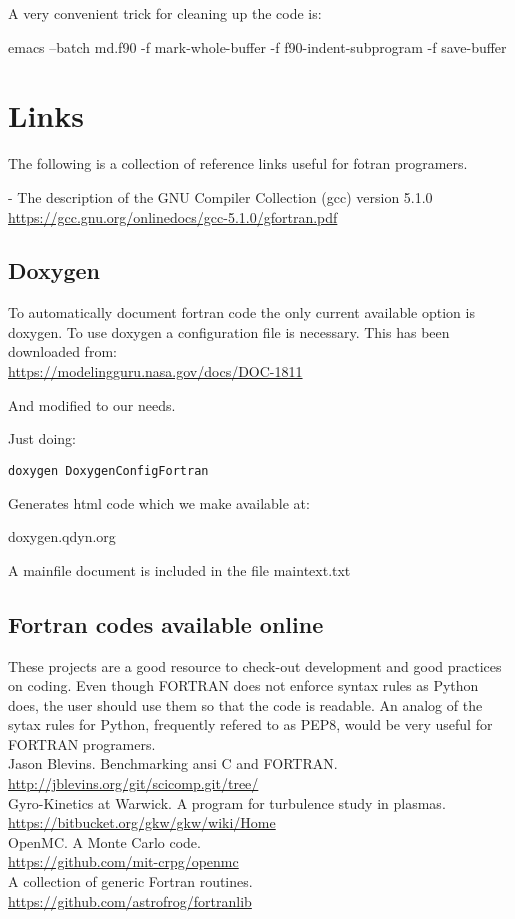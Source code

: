 \documentclass[10pt, oneside, pdftex]{article}
\begin{document}
A very convenient trick for cleaning up the code is:

emacs --batch md.f90 -f mark-whole-buffer -f f90-indent-subprogram -f save-buffer


\section{Links}
\label{links}
The following  is a  collection of reference  links useful  for fotran
programers.


\noindent - The description of the GNU Compiler Collection (gcc) version 5.1.0\\
\url{https://gcc.gnu.org/onlinedocs/gcc-5.1.0/gfortran.pdf}


\subsection{Doxygen}
\label{doxygen}
To  automatically document  fortran  code the  only current  available
option is doxygen.
To  use doxygen  a  configuration  file is  necessary.  This has  been
downloaded from:\\

\url{https://modelingguru.nasa.gov/docs/DOC-1811}

And modified to our needs.

Just doing:

\begin{lstlisting}
doxygen DoxygenConfigFortran
\end{lstlisting}


Generates html code which we make available at:

doxygen.qdyn.org

A mainfile document is included in the file maintext.txt


\subsection{Fortran codes available online}
These projects are  a good resource to check-out  development and good
practices on coding. Even though FORTRAN does not enforce syntax rules
as  Python  does,  the user  should  use  them  so  that the  code  is
readable. An analog of the  sytax rules for Python, frequently refered
to as PEP8, would be very useful for FORTRAN programers. \\

Jason Blevins. Benchmarking ansi C and FORTRAN.\\
\url{http://jblevins.org/git/scicomp.git/tree/}\\

Gyro-Kinetics at Warwick. A program for turbulence study in plasmas.\\
\url{https://bitbucket.org/gkw/gkw/wiki/Home}\\

OpenMC. A Monte Carlo code.\\
\url{https://github.com/mit-crpg/openmc}\\

A collection of generic Fortran routines.\\
\url{https://github.com/astrofrog/fortranlib}\\



\end{document}
